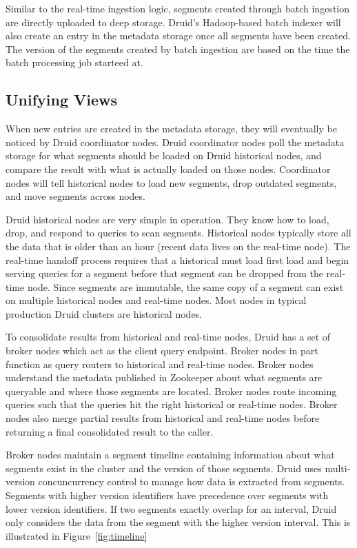\documentclass{vldb}
\begin{document}
{Similar to the real-time ingestion logic, segments created through batch
ingestion are directly uploaded to deep storage. Druid’s Hadoop-based batch
indexer will also create an entry in the metadata storage once all segments
have been created. The version of the segments created by batch ingestion are
based on the time the batch processing job starteed at.

\subsection{Unifying Views}
When new entries are created in the metadata storage, they will eventually be
noticed by Druid coordinator nodes. Druid coordinator nodes poll the metadata
storage for what segments should be loaded on Druid historical nodes, and
compare the result with what is actually loaded on those nodes. Coordinator
nodes will tell historical nodes to load new segments, drop outdated segments,
and move segments across nodes.

Druid historical nodes are very simple in operation. They know how to load,
drop, and respond to queries to scan segments. Historical nodes typically
store all the data that is older than an hour (recent data lives on the
real-time node). The real-time handoff process requires that a historical must
load first load and begin serving queries for a segment before that segment can
be dropped from the real-time node. Since segments are immutable, the same copy
of a segment can exist on multiple historical nodes and real-time nodes. Most
nodes in typical production Druid clusters are historical nodes.

To consolidate results from historical and real-time nodes, Druid has a set of
broker nodes which act as the client query endpoint. Broker nodes in part
function as query routers to historical and real-time nodes. Broker nodes
understand the metadata published in Zookeeper about what segments are
queryable and where those segments are located. Broker nodes route incoming
queries such that the queries hit the right historical or real-time nodes.
Broker nodes also merge partial results from historical and real-time nodes
before returning a final consolidated result to the caller.

Broker nodes maintain a segment timeline containing information about what
segments exist in the cluster and the version of those segments. Druid uses
multi-version concuncurrency control to manage how data is extracted from
segments. Segments with higher version identifiers have precedence over
segments with lower version identifiers. If two segments exactly overlap for an
interval, Druid only considers the data from the segment with the higher
version interval. This is illustrated in Figure~\ref{fig:timeline}

}
\end{document}
